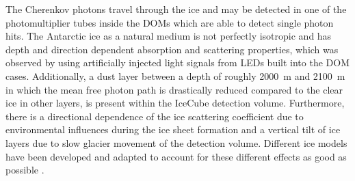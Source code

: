 The Cherenkov photons travel through the ice and may be detected in one of the photomultiplier tubes inside the DOMs which are able to detect single photon hits.
The Antarctic ice as a natural medium is not perfectly isotropic and has depth and direction dependent absorption and scattering properties, which was observed by using artificially injected light signals from LEDs built into the DOM cases.
Additionally, a dust layer between a depth of roughly \SI{2000}{\m} and \SI{2100}{\m} in which the mean free photon path is drastically reduced compared to the clear ice in other layers, is present within the IceCube detection volume.
Furthermore, there is a directional dependence of the ice scattering coefficient due to environmental influences during the ice sheet formation and a vertical tilt of ice layers due to slow glacier movement of the detection volume.
Different ice models have been developed and adapted to account for these different effects as good as possible \cite{Casey:2014SPIce,Bay:2010SPIce,Aartsen:2013rt,Chirkin:2011ice}.

